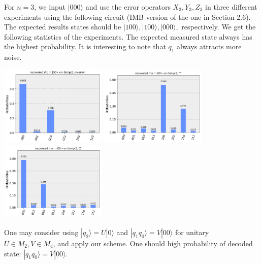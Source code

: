 \documentclass[11pt]{article}
\def\ra{{\rangle}}
\begin{document}
For $n = 3$, we input $|000\ra$ and use the error operators $X_3, Y_3, Z_3$ 
in three different experiments using the following circuit 
(IMB version of the one in Section 2.6). 
The expected results states should be $|100\ra, |100\ra, |000\ra,$ respectively.
We get the following statistics of the experiments.
The expected measured state always has the highest  probability.
It is interesting to note that $q_1$ always attracts more noise.

\medskip
\centerline{
\includegraphics[height=1.5in,width=2in]{./img/q3ibmqx2.png} \quad
\includegraphics[height=1.5in,width=2in]{./img/q3ibmqx2Y.png} \quad
\includegraphics[height=1.5in,width=2in]{./img/q3ibmqx2Z.png} \quad
}

One may consider using $|q_2\ra = U|0\ra$ and  $|q_1q_0\ra = V|00\ra$
for unitary $U \in M_2, V \in M_4$, and apply our scheme.
One should high probability of decoded state: $|q_1q_0\ra = V|00\ra$.
\end{document}
